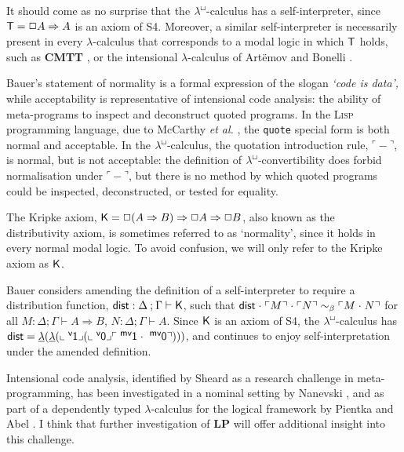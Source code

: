 \documentclass{entcs}
\newcommand{\lambdabox}{\lambda^{\mkern-1mu\sq\mkern-2mu}}
\renewcommand{\:}{\mathrel{:}}
\renewcommand{\;}{\mathbin{;}}
\newcommand{\tsf}[1]{\textsf{\upshape{#1}}}
\newcommand{\stsf}[1]{\tsf{\small{#1}}}
\newcommand{\R}{\Rightarrow}
\newcommand{\sq}{\Box}
\renewcommand{\e}{\mathrel{\vdash}}
\newcommand{\lam}{\operatorname{\underline{\lambda}}}
\newcommand{\app}{\mathrel{\cdot}}
\newcommand{\quo}[1]{\mathord{\ulcorner}{#1}\mathord{\urcorner}}
\newcommand{\unquo}[2]{\mathord{\llcorner}{#1}\mathord{\lrcorner}{#2}}
\newcommand{\mvO}{\operatorname{^{\stsf{mv}\mkern-1mu}\tsf{0}}}
\newcommand{\mvI}{\operatorname{^{\stsf{mv}\mkern-1mu}\tsf{1}}}
\newcommand{\vO}{\operatorname{^{\stsf{v}\mkern-1mu}\tsf{0}}}
\newcommand{\vI}{\operatorname{^{\stsf{v}\mkern-1mu}\tsf{1}}}
\newcommand{\bconv}{\mathrel{\sim_{\beta}}}
\newcommand{\Taxiom}{\operatorname{\tsf{T}}}
\newcommand{\Kaxiom}{\operatorname{\tsf{K}}}
\newcommand{\dist}{\operatorname{\tsf{dist}}}
\begin{document}
It should come as no surprise that the $\lambdabox$-calculus has a self-interpreter, since $\Taxiom = \sq A \R A$ is an axiom of S4.  Moreover, a similar self-interpreter is necessarily present in every $\lambda$-calculus that corresponds to a modal logic in which $\Taxiom$ holds, such as \textbf{CMTT} \cite{NanevskiPP08}, or the intensional $\lambda$-calculus of Art\"{e}mov and Bonelli \cite{ArtemovB07}.

Bauer's statement of normality is a formal expression of the slogan \emph{`code is data',} while acceptability is representative of intensional code analysis: the ability of meta-programs to inspect and deconstruct quoted programs.  In the \textsc{Lisp} programming language, due to McCarthy \emph{et al.} \cite{McCarthyAEHL62}, the \texttt{quote} special form is both normal and acceptable.  In the $\lambdabox$-calculus, the quotation introduction rule, $\quo{-}$, is normal, but is not acceptable: the definition of $\lambdabox$-convertibility does forbid normalisation under $\quo{-}$, but there is no method by which quoted programs could be inspected, deconstructed, or tested for equality.

The Kripke axiom, $\Kaxiom = \sq (A \R B) \R \sq A \R \sq B$, also known as the distributivity axiom, is sometimes referred to as `normality', since it holds in every normal modal logic.  To avoid confusion, we will only refer to the Kripke axiom as $\Kaxiom$.

Bauer considers amending the definition of a self-interpreter to require a distribution function, $\dist \: \Delta \; \Gamma \e \Kaxiom$, such that $\dist \app \quo{M} \app \quo{N} \bconv \quo{M \app N}$ for all $M \: \Delta \; \Gamma \e A \R B$, $N \: \Delta \; \Gamma \e A$.  Since $\Kaxiom$ is an axiom of S4, the $\lambdabox$-calculus has $\dist = \lam (\lam (\unquo{\vI}{(\unquo{\vO}{\quo{\mvI \app \mvO}})}))$, and continues to enjoy self-interpretation under the amended definition.

Intensional code analysis, identified by Sheard \cite{Sheard01} as a research challenge in meta-programming, has been investigated in a nominal setting by Nanevski \cite{Nanevski02,Nanevski04}, and as part of a dependently typed $\lambda$-calculus for the logical framework by Pientka and Abel \cite{PientkaA15}.  I think that further investigation of \textbf{LP} \cite{Artemov01} will offer additional insight into this challenge.


\end{document}
